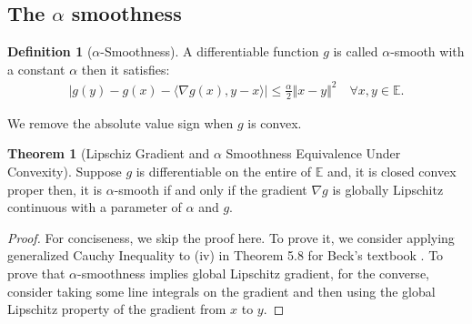 \documentclass[]{article}
\theoremstyle{definition}
\newtheorem{theorem}{Theorem}       %
\newtheorem{definition}{Definition}
\begin{document}
    \subsection{The $\alpha$ smoothness}
        \begin{definition}[$\alpha$-Smoothness]\label{def:strong_smoothness}
            A differentiable function $g$ is called $\alpha$-smooth with a constant $\alpha$ then it satisfies: 
            \begin{align}
                |g(y) - g(x) - 
                \langle \nabla g(x), y - x
                \rangle| \le \frac{\alpha}{2}\Vert x - y\Vert^2
                \quad \forall x, y\in \mathbb E. 
            \end{align}    
        \end{definition}
        We remove the absolute value sign when $g$ is convex. 
        \begin{theorem}[Lipschiz Gradient and $\alpha$ Smoothness Equivalence Under Convexity]\label{thm:cvx_lipz_grad}
            Suppose $g$ is differentiable on the entire of $\mathbb E$ and, it is closed convex proper then, it is $\alpha$-smooth if and only if the gradient $\nabla g$ is globally Lipschitz continuous with a parameter of $\alpha$ and $g$.
        \end{theorem}
        \begin{proof}
            For conciseness, we skip the proof here. To prove it, we consider applying generalized Cauchy Inequality to (iv) in Theorem 5.8 for Beck's textbook \cite{book:first_order_opt}. To prove that $\alpha$-smoothness implies global Lipschitz gradient, for the converse, consider taking some line integrals on the gradient and then using the global Lipschitz property of the gradient from $x$ to $y$. 
        \end{proof}
        
\end{document}
